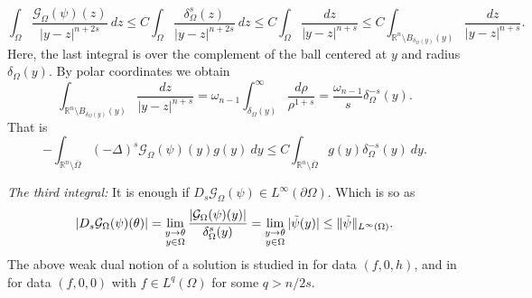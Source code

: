 \documentclass{amsart}
\newcommand{\R}{\mathbb{R}}
\newcommand{\slap}{(-\Delta)^{s}}
\newcommand{\g}[1]{\mathcal{G}_{#1}}
\newcommand{\Ds}{D_{s}}
\begin{document}
 \begin{equation*}
     \int_{\Omega}\frac{\g{\Omega}(\psi)(z)}{|y-z|^{n+2s}}\ dz\leq C\int_{\Omega}\frac{\delta_{\Omega}^{s}(z)}{|y-z|^{n+2s}}\ dz\leq C\int_{\Omega}\frac{dz}{|y-z|^{n+s}}\leq C\int_{\R^{n}\setminus B_{\delta_{\Omega}(y)}(y)}\frac{dz}{|y-z|^{n+s}}.
 \end{equation*}
 Here, the last integral is over the complement of the ball centered at $y$ and radius $\delta_{\Omega}(y)$. By polar coordinates we obtain
 \begin{equation*}
     \int_{\R^{n}\setminus B_{\delta_{\Omega}(y)}(y)}\frac{dz}{|y-z|^{n+s}}=\omega_{n-1}\int_{\delta_{\Omega}(y)}^{\infty}\frac{d\rho}{\rho^{1+s}}=\frac{\omega_{n-1}}{s}\delta_{\Omega}^{-s}(y).
 \end{equation*}
 That is 
 \begin{equation}\label{eqn complement integral behaviour}
    -\int_{\R^{n}\setminus\overline{\Omega}
        }\slap \g{\Omega}(\psi)(y) g(y) \ dy\leq  C \int_{\R^{n}\setminus\overline{\Omega}}g(y)\delta_{\Omega}^{-s}(y)\ dy.
        \end{equation}
   \smallskip 
   
 \textit{The third integral:} It is enough if $\Ds\g{\Omega}(\psi)\in L^{\infty}(\partial\Omega)$. Which is so as
 \begin{equation*}
     |\Ds\g{\Omega}(\psi)(\theta)|=\lim_{\substack{y\to \theta\\ y\in \Omega}}\frac{|\g{\Omega}(\psi)(y)|}{\delta_{\Omega}^{s}(y)}=\lim_{\substack{y\to \theta\\ y\in \Omega}}|\Tilde{\psi}(y)|\leq \|\Tilde{\psi}\|_{L^{\infty}(\Omega)}.
     \end{equation*}
The above weak dual notion of a solution is studied in \cite{AbatangeloVazquez2023} for data $(f,0,h)$, and in \cite{BonforteFigalliVazquez2018} for data $(f,0,0)$ with $f\in L^{q}(\Omega)$ for some $ q>n/2s$.
\end{document}
